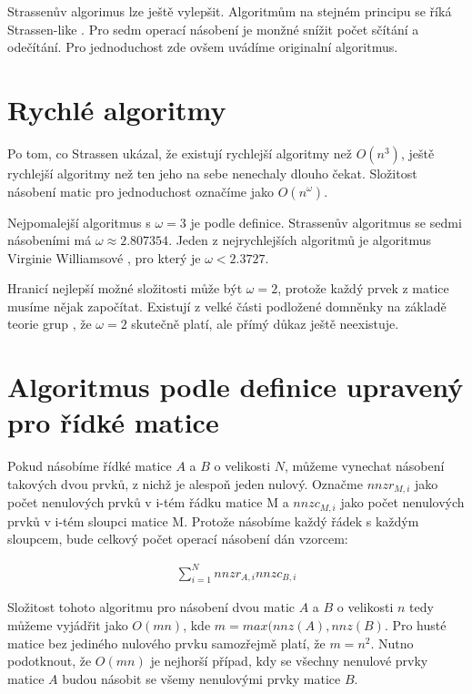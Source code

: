 Strassenův algorimus lze ještě vylepšit. Algoritmům na stejném principu se říká Strassen-like \cite{DBLP:journals/iacr/CenkH13}. Pro sedm operací násobení je monžné snížit počet sčítání a odečítání. Pro jednoduchost zde ovšem uvádíme originalní algoritmus.

\section{Rychlé algoritmy}

Po tom, co Strassen ukázal, že existují rychlejší algoritmy než $O(n^3)$, ještě rychlejší algoritmy než ten jeho na sebe nenechaly dlouho čekat. Složitost násobení matic pro jednoduchost označíme jako $O(n^\omega)$.

Nejpomalejší algoritmus s $\omega=3$ je podle definice. Strassenův algoritmus se sedmi násobeními má $\omega\approx2.807354$. Jeden z nejrychlejších algoritmů je algoritmus Virginie Williamsové \cite{DBLP:conf/stoc/Williams12}\cite{BreakigCWB}, pro který je $\omega<2.3727$. 

Hranicí nejlepší možné složitosti může být $\omega=2$, protože každý prvek z matice musíme nějak započítat. Existují z velké části podložené domněnky na základě teorie grup \cite{complexityMM}, že $\omega=2$ skutečně platí, ale přímý důkaz ještě neexistuje.

\section{Algoritmus podle definice upravený pro řídké matice}

Pokud násobíme řídké matice $A$ a $B$ o velikosti $N$, můžeme vynechat násobení takových dvou prvků, z nichž je alespoň jeden nulový. Označme $nnzr_{M,i}$ jako počet nenulových prvků v i-tém řádku matice M a $nnzc_{M,i}$ jako počet nenulových prvků v i-tém sloupci matice M. Protože násobíme každý řádek s každým sloupcem, bude celkový počet operací násobení dán vzorcem:

\begin{align*}
\sum_{i=1}^{N} nnzr_{A,i} nnzc_{B,i}
\end{align*}

Složitost tohoto algoritmu pro násobení dvou matic $A$ a $B$ o velikosti $n$ tedy můžeme vyjádřit jako $O(mn)$, kde $m = max(nnz(A),nnz(B)$. Pro husté matice bez jediného nulového prvku samozřejmě platí, že $m=n^2$. Nutno podotknout, že $O(mn)$ je nejhorší případ, kdy se všechny nenulové prvky matice $A$ budou násobit se všemy nenulovými prvky matice $B$.

